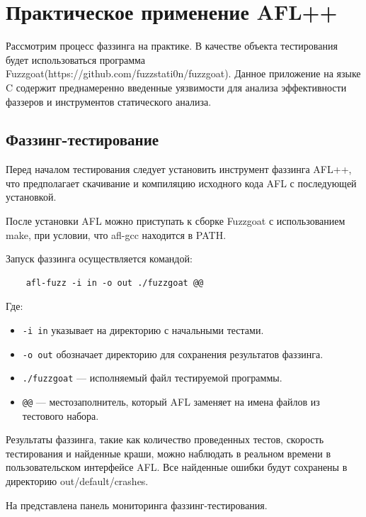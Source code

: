 \chapter{Практическое применение AFL++} \label{ch4}
Рассмотрим процесс фаззинга на практике. В качестве объекта тестирования будет использоваться программа Fuzzgoat(https://github.com/fuzzstati0n/fuzzgoat).
Данное приложение на языке C содержит преднамеренно введенные уязвимости для анализа эффективности фаззеров и инструментов статического анализа.
\section{Фаззинг-тестирование} \label{ch4:sec1}

Перед началом тестирования следует установить инструмент фаззинга AFL++, что предполагает скачивание и компиляцию исходного кода AFL с последующей установкой.

После установки AFL можно приступать к сборке Fuzzgoat с использованием make, при условии, что afl-gcc находится в PATH.

Запуск фаззинга осуществляется командой:
\begin{verbatim}
	afl-fuzz -i in -o out ./fuzzgoat @@
\end{verbatim}

Где:
\begin{itemize}
	\item \texttt{-i in} указывает на директорию с начальными тестами.
	\item \texttt{-o out} обозначает директорию для сохранения результатов фаззинга.
	\item \texttt{./fuzzgoat} — исполняемый файл тестируемой программы.
	\item \texttt{@@} — местозаполнитель, который AFL заменяет на имена файлов из тестового набора.
\end{itemize}

Результаты фаззинга, такие как количество проведенных тестов, скорость тестирования и найденные краши, можно наблюдать в реальном времени в пользовательском интерфейсе AFL. Все найденные ошибки будут сохранены в директорию out/default/crashes.

На  представлена панель мониторинга фаззинг-тестирования.

